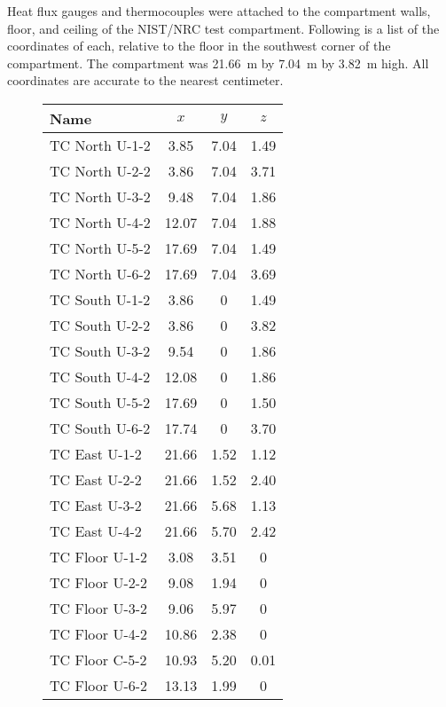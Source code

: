 Heat flux gauges and thermocouples were attached to the compartment walls, floor, and ceiling of the NIST/NRC test compartment. Following is a list of the
coordinates of each, relative to the floor in the southwest corner of the compartment. The compartment was 21.66~m by 7.04~m by 3.82~m high. All coordinates are
accurate to the nearest centimeter.

\begin{figure}[h!]
\begin{center}
\begin{tabular}{|l|c|c|c|}
\hline
Name              & $x$   & $y$  & $z$ \\ \hline \hline
TC North U-1-2    & 3.85  & 7.04 & 1.49 \\ \hline
TC North U-2-2    & 3.86  & 7.04 & 3.71 \\ \hline
TC North U-3-2    & 9.48  & 7.04 & 1.86 \\ \hline
TC North U-4-2    & 12.07 & 7.04 & 1.88 \\ \hline
TC North U-5-2    & 17.69 & 7.04 & 1.49 \\ \hline
TC North U-6-2    & 17.69 & 7.04 & 3.69 \\ \hline
TC South U-1-2    & 3.86  & 0    & 1.49 \\ \hline
TC South U-2-2    & 3.86  & 0    & 3.82 \\ \hline
TC South U-3-2    & 9.54  & 0    & 1.86 \\ \hline
TC South U-4-2    & 12.08 & 0    & 1.86 \\ \hline
TC South U-5-2    & 17.69 & 0    & 1.50 \\ \hline
TC South U-6-2    & 17.74 & 0    & 3.70 \\ \hline
TC East U-1-2     & 21.66 & 1.52 & 1.12 \\ \hline
TC East U-2-2     & 21.66 & 1.52 & 2.40 \\ \hline
TC East U-3-2     & 21.66 & 5.68 & 1.13 \\ \hline
TC East U-4-2     & 21.66 & 5.70 & 2.42 \\ \hline
TC Floor U-1-2    & 3.08  & 3.51 & 0 \\ \hline
TC Floor U-2-2    & 9.08  & 1.94 & 0 \\ \hline
TC Floor U-3-2    & 9.06  & 5.97 & 0 \\ \hline
TC Floor U-4-2    & 10.86 & 2.38 & 0 \\ \hline
TC Floor C-5-2    & 10.93 & 5.20 & 0.01 \\ \hline
TC Floor U-6-2    & 13.13 & 1.99 & 0 \\ \hline

\end{tabular}
\end{center}
\end{figure}
